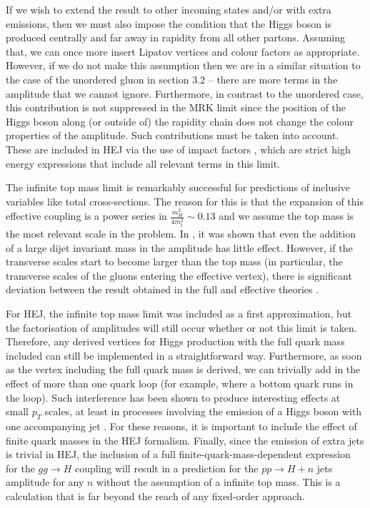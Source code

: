 If we wish to extend the result to other incoming states and/or with extra emissions, then we must also impose the condition that the Higgs boson is produced centrally and far away in rapidity from all other partons. Assuming that, we can once more insert Lipatov vertices and colour factors as appropriate. However, if we do not make this assumption then we are in a similar situation to the case of the unordered gluon in section 3.2 -- there are more terms in the amplitude that we cannot ignore. Furthermore, in contrast to the unordered case, this contribution is not suppressed in the MRK limit since the position of the Higgs boson along (or outside of) the rapidity chain does not change the colour properties of the amplitude. Such contributions must be taken into account. These are included in HEJ via the use of impact factors \cite{Duca2003}, which are strict high energy expressions that include all relevant terms in this limit.   

The infinite top mass limit is remarkably successful for predictions of inclusive variables like total cross-sections. The reason for this is that the expansion of this effective coupling is a power series in $\frac{m_H^2}{4 m_t^2} \sim 0.13$ and we assume the top mass is the most relevant scale in the problem. In \cite{Duca2003}, it was shown that even the addition of a large dijet invariant mass in the amplitude has little effect. However, if the transverse scales start to become larger than the top mass (in particular, the transverse scales of the gluons entering the effective vertex), there is significant deviation between the result obtained in the full and effective theories \cite{Duca2003}. 

For HEJ, the infinite top mass limit was included as a first approximation, but the factorisation of amplitudes will still occur whether or not this limit is taken. Therefore, any derived vertices for Higgs production with the full quark mass included can still be implemented in a straightforward way. Furthermore, as soon as the vertex including the full quark mass is derived, we can trivially add in the effect of more than one quark loop (for example, where a bottom quark runs in the loop). Such interference has been shown to produce interesting effects at small $p_T$ scales, at least in processes involving the emission of a Higgs boson with one accompanying jet \cite{Grazzini2013, Lindert2017}. For these reasons, it is important to include the effect of finite quark masses in the HEJ formalism. Finally, since the emission of extra jets is trivial in HEJ, the inclusion of a full finite-quark-mass-dependent expression for the $gg \to H$ coupling will result in a prediction for the $pp \to H + n$ jets amplitude for any $n$ without the assumption of a infinite top mass. This is a calculation that is far beyond the reach of any fixed-order approach. 

